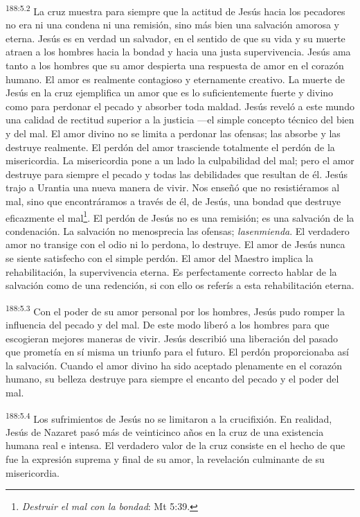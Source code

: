 \par 
\textsuperscript{188:5.2} La cruz muestra para siempre que la actitud de Jesús hacia los pecadores no era ni una condena ni una remisión, sino más bien una salvación amorosa y eterna. Jesús es en verdad un salvador, en el sentido de que su vida y su muerte atraen a los hombres hacia la bondad y hacia una justa supervivencia. Jesús ama tanto a los hombres que su amor despierta una respuesta de amor en el corazón humano. El amor es realmente contagioso y eternamente creativo. La muerte de Jesús en la cruz ejemplifica un amor que es lo suficientemente fuerte y divino como para perdonar el pecado y absorber toda maldad. Jesús reveló a este mundo una calidad de rectitud superior a la justicia ---el simple concepto técnico del bien y del mal. El amor divino no se limita a perdonar las ofensas; las absorbe y las destruye realmente. El perdón del amor trasciende totalmente el perdón de la misericordia. La misericordia pone a un lado la culpabilidad del mal; pero el amor destruye para siempre el pecado y todas las debilidades que resultan de él. Jesús trajo a Urantia una nueva manera de vivir. Nos enseñó que no resistiéramos al mal, sino que encontráramos a través de él, de Jesús, una bondad que destruye eficazmente el mal\footnote{\textit{Destruir el mal con la bondad}: Mt 5:39.}. El perdón de Jesús no es una remisión; es una salvación de la condenación. La salvación no menosprecia las ofensas; \textit{lasenmienda}. El verdadero amor no transige con el odio ni lo perdona, lo destruye. El amor de Jesús nunca se siente satisfecho con el simple perdón. El amor del Maestro implica la rehabilitación, la supervivencia eterna. Es perfectamente correcto hablar de la salvación como de una redención, si con ello os referís a esta rehabilitación eterna.

\par 
\textsuperscript{188:5.3} Con el poder de su amor personal por los hombres, Jesús pudo romper la influencia del pecado y del mal. De este modo liberó a los hombres para que escogieran mejores maneras de vivir. Jesús describió una liberación del pasado que prometía en sí misma un triunfo para el futuro. El perdón proporcionaba así la salvación. Cuando el amor divino ha sido aceptado plenamente en el corazón humano, su belleza destruye para siempre el encanto del pecado y el poder del mal.

\par 
\textsuperscript{188:5.4} Los sufrimientos de Jesús no se limitaron a la crucifixión. En realidad, Jesús de Nazaret pasó más de veinticinco años en la cruz de una existencia humana real e intensa. El verdadero valor de la cruz consiste en el hecho de que fue la expresión suprema y final de su amor, la revelación culminante de su misericordia.

